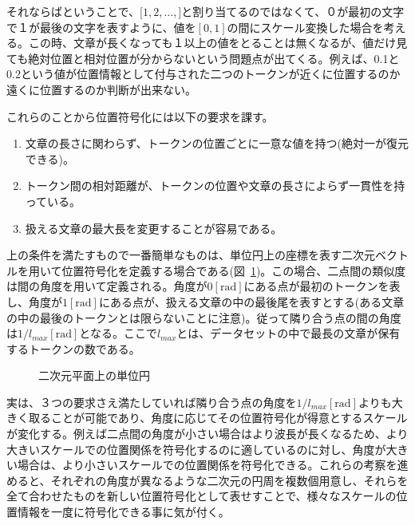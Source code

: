 それならばということで、$\lbrack1, 2, \ldots, \rbrack$と割り当てるのではなくて、０が最初の文字で１が最後の文字を表すように、値を$[0, 1]$の間にスケール変換した場合を考える。この時、文章が長くなっても１以上の値をとることは無くなるが、値だけ見ても絶対位置と相対位置が分からないという問題点が出てくる。例えば、0.1と0.2という値が位置情報として付与された二つのトークンが近くに位置するのか遠くに位置するのか判断が出来ない。

これらのことから位置符号化には以下の要求を課す。
\begin{enumerate}
  \item 文章の長さに関わらず、トークンの位置ごとに一意な値を持つ(絶対一が復元できる)。
  \item トークン間の相対距離が、トークンの位置や文章の長さによらず一貫性を持っている。
  \item 扱える文章の最大長を変更することが容易である。
\end{enumerate}

上の条件を満たすもので一番簡単なものは、単位円上の座標を表す二次元ベクトルを用いて位置符号化を定義する場合である(図~\ref{fig:pos-encoding-circle})。この場合、二点間の類似度は間の角度を用いて定義される。角度が$0[\text{rad}]$にある点が最初のトークンを表し、角度が$1[\text{rad}]$にある点が、扱える文章の中の最後尾を表すとする(ある文章の中の最後のトークンとは限らないことに注意)。従って隣り合う点の間の角度は$1/l_{max} [\text{rad}]$となる。ここで$l_{max}$とは、データセットの中で最長の文章が保有するトークンの数である。

\begin{figure}
  \centering

  \caption{二次元平面上の単位円}
\label{fig:pos-encoding-circle}

\end{figure}
実は、３つの要求さえ満たしていれば隣り合う点の角度を$1/l_{max} [\text{rad}]$よりも大きく取ることが可能であり、角度に応じてその位置符号化が得意とするスケールが変化する。例えば二点間の角度が小さい場合はより波長が長くなるため、より大きいスケールでの位置関係を符号化するのに適しているのに対し、角度が大きい場合は、より小さいスケールでの位置関係を符号化できる。これらの考察を進めると、それぞれの角度が異なるような二次元の円周を複数個用意し、それらを全て合わせたものを新しい位置符号化として表せすことで、様々なスケールの位置情報を一度に符号化できる事に気が付く。

